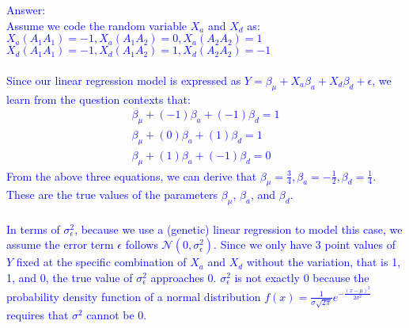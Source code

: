 \documentclass[letterpaper, 11pt]{article}
\begin{document}
\textcolor{blue}{Answer: \\
Assume we code the random variable $X_a$ and $X_d$ as: \\
$X_a(A_1A_1) = -1, X_a(A_1A_2) = 0, X_a(A_2A_2) = 1$\\ 
$X_d(A_1A_1) = -1, X_d(A_1A_2) = 1, X_d(A_2A_2) = -1$\\\\
Since our linear regression model is expressed as $Y = \beta_\mu + X_a\beta_a + X_d\beta_d + \epsilon$, we learn from the question contexts that:
\begin{align*}
\beta_\mu + (-1)\beta_a + (-1)\beta_d = 1 \\
\beta_\mu + (0)\beta_a + (1)\beta_d = 1\\
\beta_\mu + (1)\beta_a + (-1)\beta_d = 0 
\end{align*}
From the above three equations, we can derive that $\beta_\mu = \frac{3}{4}, \beta_a = -\frac{1}{2}, \beta_d = \frac{1}{4}$. These are the true values of the parameters $\beta_\mu$, $\beta_a$, and $\beta_d$.\\\\
In terms of $\sigma^2_\epsilon$, because we use a (genetic) linear regression to model this case, we assume the error term $\epsilon$ follows $\mathcal{N}(0, \sigma^2_\epsilon)$. Since we only have 3 point values of $Y$ fixed at the specific combination of $X_a$ and $X_d$ without the variation, that is 1, 1, and 0, the true value of $\sigma^2_\epsilon$ approaches 0. $\sigma^2_\epsilon$ is not exactly 0 because the probability density function of a normal distribution $f(x) = \frac{1}{\sigma\sqrt{2\pi}} e^{-\frac{(x-\mu)^2}{2\sigma^2}}$ requires that $\sigma^2$ cannot be 0.
}\\\\
\end{document}
